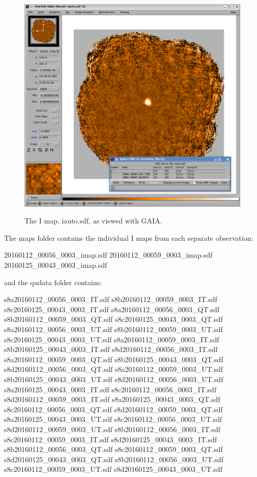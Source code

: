 \begin{figure}[t!]
\begin{center}
\includegraphics[width=0.8\linewidth]{sc22-gaia-view-iauto.png}
\label{fig:gaia-iauto}
\caption [I map in GAIA]{
  \small The I map, iauto.sdf, as viewed with GAIA.
}
\end{center}
\end{figure}

The maps folder contains the individual I maps from each separate observation:

\begin{terminalv}
20160112_00056_0003_imap.sdf  20160112_00059_0003_imap.sdf  20160125_00043_0003_imap.sdf
\end{terminalv}

and the qudata folder contains:

\begin{terminalv}
s8a20160112_00056_0003_IT.sdf  s8b20160112_00059_0003_IT.sdf  s8c20160125_00043_0003_IT.sdf
s8a20160112_00056_0003_QT.sdf  s8b20160112_00059_0003_QT.sdf  s8c20160125_00043_0003_QT.sdf
s8a20160112_00056_0003_UT.sdf  s8b20160112_00059_0003_UT.sdf  s8c20160125_00043_0003_UT.sdf
s8a20160112_00059_0003_IT.sdf  s8b20160125_00043_0003_IT.sdf  s8d20160112_00056_0003_IT.sdf
s8a20160112_00059_0003_QT.sdf  s8b20160125_00043_0003_QT.sdf  s8d20160112_00056_0003_QT.sdf
s8a20160112_00059_0003_UT.sdf  s8b20160125_00043_0003_UT.sdf  s8d20160112_00056_0003_UT.sdf
s8a20160125_00043_0003_IT.sdf  s8c20160112_00056_0003_IT.sdf  s8d20160112_00059_0003_IT.sdf
s8a20160125_00043_0003_QT.sdf  s8c20160112_00056_0003_QT.sdf  s8d20160112_00059_0003_QT.sdf
s8a20160125_00043_0003_UT.sdf  s8c20160112_00056_0003_UT.sdf  s8d20160112_00059_0003_UT.sdf
s8b20160112_00056_0003_IT.sdf  s8c20160112_00059_0003_IT.sdf  s8d20160125_00043_0003_IT.sdf
s8b20160112_00056_0003_QT.sdf  s8c20160112_00059_0003_QT.sdf  s8d20160125_00043_0003_QT.sdf
s8b20160112_00056_0003_UT.sdf  s8c20160112_00059_0003_UT.sdf  s8d20160125_00043_0003_UT.sdf
\end{terminalv}


